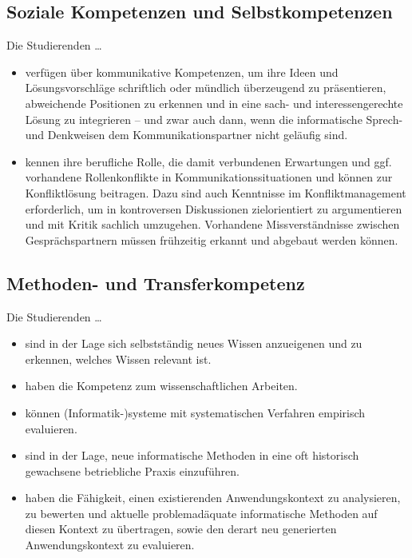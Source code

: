 \subsection{Soziale Kompetenzen und
Selbstkompetenzen}\label{soziale-kompetenzen-und-selbstkompetenzen}

Die Studierenden \ldots{}

\begin{itemize}
\tightlist
\item
  verfügen über kommunikative Kompetenzen, um ihre Ideen und
  Lösungsvorschläge schriftlich oder mündlich überzeugend zu
  präsentieren, abweichende Positionen zu erkennen und in eine sach- und
  interessengerechte Lösung zu integrieren -- und zwar auch dann, wenn
  die informatische Sprech- und Denkweisen dem Kommunikationspartner
  nicht geläufig sind.
\item
  kennen ihre berufliche Rolle, die damit verbundenen Erwartungen und
  ggf. vorhandene Rollenkonflikte in Kommunikationssituationen und
  können zur Konfliktlösung beitragen. Dazu sind auch Kenntnisse im
  Konfliktmanagement erforderlich, um in kontroversen Diskussionen
  zielorientiert zu argumentieren und mit Kritik sachlich umzugehen.
  Vorhandene Missverständnisse zwischen Gesprächspartnern müssen
  frühzeitig erkannt und abgebaut werden können.
\end{itemize}

\subsection{Methoden- und
Transferkompetenz}\label{methoden--und-transferkompetenz}

Die Studierenden \ldots{}

\begin{itemize}
\tightlist
\item
  sind in der Lage sich selbstständig neues Wissen anzueigenen und zu
  erkennen, welches Wissen relevant ist.
\item
  haben die Kompetenz zum wissenschaftlichen Arbeiten.
\item
  können (Informatik-)systeme mit systematischen Verfahren empirisch
  evaluieren.
\item
  sind in der Lage, neue informatische Methoden in eine oft historisch
  gewachsene betriebliche Praxis einzuführen.
\item
  haben die Fähigkeit, einen existierenden Anwendungskontext zu
  analysieren, zu bewerten und aktuelle problemadäquate informatische
  Methoden auf diesen Kontext zu übertragen, sowie den derart neu
  generierten Anwendungskontext zu evaluieren.
\end{itemize}


